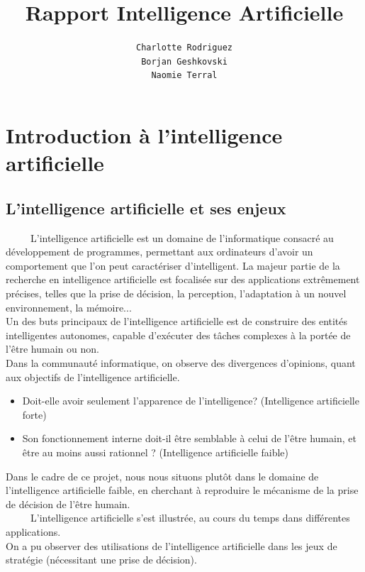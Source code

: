\documentclass[a4paper,12pt]{report}
\begin{document}
\title{Rapport Intelligence Artificielle}

\author{\texttt{Charlotte Rodriguez}\\
		\texttt{Borjan Geshkovski}\\
		\texttt{Naomie Terral}
		}
\maketitle

\section{Introduction à l'intelligence artificielle}

\subsection{L'intelligence artificielle et ses enjeux}
\ \ \ \ \ L'intelligence artificielle est un domaine de l'informatique consacré au développement de programmes, permettant aux ordinateurs d'avoir un comportement que l'on peut caractériser d'intelligent. La majeur partie de la recherche en intelligence artificielle est focalisée sur des applications extrêmement précises, telles que la prise de décision, la perception, l'adaptation à un nouvel environnement, la mémoire... \\
Un des buts principaux de l'intelligence artificielle est de construire des entités intelligentes autonomes, capable d'exécuter des tâches complexes à la portée de l'être humain ou non. \\ 
Dans la communauté informatique, on observe des divergences d'opinions, quant aux objectifs de l'intelligence artificielle. 
\begin{itemize}
\item Doit-elle avoir seulement l'apparence de l'intelligence? (Intelligence artificielle forte)
\item Son fonctionnement interne doit-il être semblable à celui de l'être humain, et être au moins aussi rationnel ? (Intelligence artificielle faible)
\end{itemize}
Dans le cadre de ce projet, nous nous situons plutôt dans le domaine de l'intelligence artificielle faible, en cherchant à reproduire le mécanisme de la prise de décision de l'être humain. \\
\ \ \ \ \ L'intelligence artificielle s'est illustrée, au cours du temps dans différentes applications. \\
On a pu observer des utilisations de l'intelligence artificielle dans les jeux de stratégie (nécessitant une prise de décision).
\end{document}
